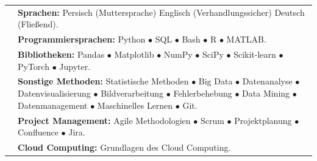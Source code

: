 \documentclass[oneside]{article}
\begin{document}
{\begin{minipage}[t][\textheight-2\fboxsep-2\fboxrule][t]{\dimexpr0.41\textwidth-2\fboxrule-2\fboxsep\relax}
        \begin{tabularx}{\textwidth}{@{}lX@{}} %
            \faLanguage{}   & \textbf{\small Sprachen:} \newline  Persisch (Muttersprache) \newline Englisch (Verhandlungssicher) \newline Deutsch (Flie\ss end).\\
            \faCode{}        & \textbf{\small Programmiersprachen:} \newline Python $\bullet$ SQL $\bullet$ Bash $\bullet$  R $\bullet$ MATLAB.\\
            
            \faLaptopCode{}  & \textbf{\small Bibliotheken:} \newline Pandas $\bullet$ Matplotlib $\bullet$  NumPy $\bullet$ SciPy $\bullet$ Scikit-learn $\bullet$ PyTorch $\bullet$ Jupyter. \\
            
            \faCogs{}        & \textbf{\small Sonstige Methoden:} \newline Statistische Methoden $\bullet$ Big Data $\bullet$ Datenanalyse $\bullet$ Datenvisualisierung $\bullet$ Bildverarbeitung $\bullet$ Fehlerbehebung $\bullet$ Data Mining $\bullet$ Datenmanagement $\bullet$ Maschinelles Lernen $\bullet$ Git. \\ %
            
            \faToolbox{}     & \textbf{\small Project Management:} \newline Agile Methodologien $\bullet$ Scrum $\bullet$ \newline Projektplanung $\bullet$ Confluence $\bullet$ Jira. \\
            
            \faCloud{}       & \textbf{\small Cloud Computing:}  \newline Grundlagen des Cloud Computing.%
            \\
            
        \end{tabularx}


        \vspace{1pt}
        
    \end{minipage}
}
\hfill
\end{document}
